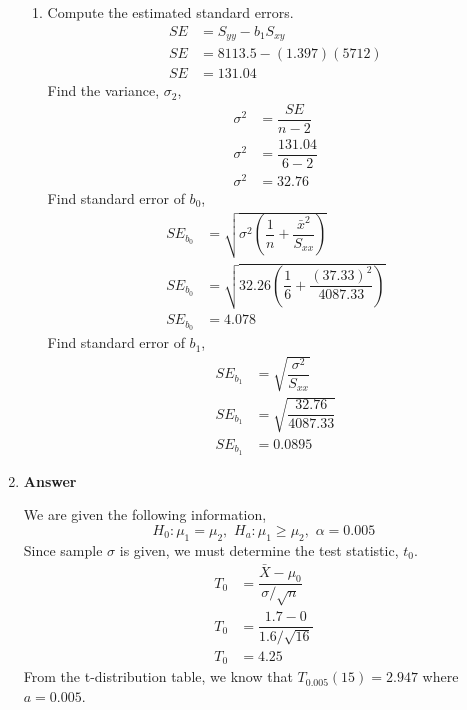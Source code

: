 \documentclass[12pt]{book}
\begin{document}
\begin{enumerate}
\begin{enumerate}
        \item Compute the estimated standard errors.
        \begin{align*}
            SE &= S_{yy} - b_1 S_{xy}\\
            SE &= 8113.5 - (1.397)(5712)\\
            SE &= 131.04
        \end{align*}
        Find the variance, $\sigma_2$,
        \begin{align*}
            \sigma^2 &= \dfrac{SE}{n-2}\\
            \sigma^2 &= \dfrac{131.04}{6 - 2}\\
            \sigma^2 &= 32.76
        \end{align*}
        Find standard error of $b_0$,
        \begin{align*}
            SE_{b_0} &= \sqrt{\sigma^2 \left(\dfrac{1}{n} + \dfrac{\bar{x}^2}{S_{xx}}\right)}\\
            SE_{b_0} &= \sqrt{32.26 \left(\dfrac{1}{6} + \dfrac{(37.33)^2}{4087.33}\right)}\\
            SE_{b_0} &= 4.078
        \end{align*}
        Find standard error of $b_1$,
        \begin{align*}
            SE_{b_1} &= \sqrt{\dfrac{\sigma^2}{S_{xx}}}\\
            SE_{b_1} &= \sqrt{\dfrac{32.76}{4087.33}}\\
            SE_{b_1} &= 0.0895
        \end{align*}
        
        
        
        
    \end{enumerate}
    
    
    \newpage
    
    \item \textbf{Answer}
    
    We are given the following information,
    $$ H_0: \mu_1 = \mu_2, \,\, H_a: \mu_1 \geq \mu_2, \,\, \alpha = 0.005$$
    Since sample $\sigma$ is given, we must determine the test statistic, $t_0$.
    \begin{align*}
        T_0 &= \dfrac{\bar{X} - \mu_0}{\sigma / \sqrt{n}}\\
        T_0 &= \dfrac{1.7 - 0}{1.6 / \sqrt{16}}\\
        T_0 &= 4.25
    \end{align*}
    From the t-distribution table, we know that $T_0.005(15) = 2.947$ where $a = 0.005$.\\
    

\end{enumerate}
\end{document}
